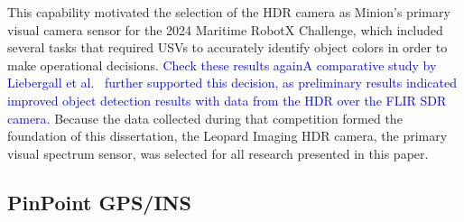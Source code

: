 \documentclass{erauthesis}
\begin{document}
This capability motivated the selection of the \ac{HDR} camera as Minion's primary visual camera sensor for the 2024 Maritime RobotX Challenge, which included several tasks that required \acp{USV} to accurately identify object colors in order to make operational decisions.
\textcolor{blue}{Check these results again}\textcolor{blue}{A comparative study by Liebergall et al.~\cite{liebergall} further supported this decision, as preliminary results indicated improved object detection results with data from the \ac{HDR} over the FLIR \ac{SDR} camera.}
Because the data collected during that competition formed the foundation of this dissertation, the Leopard Imaging \ac{HDR} camera, the primary visual spectrum sensor, was selected for all research presented in this paper.






\subsection{PinPoint GPS/INS} \label{sensors_GPS}

\end{document}
